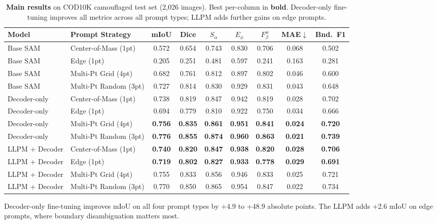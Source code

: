 \begin{table}[t]
\centering
\caption{\textbf{Main results} on COD10K camouflaged test set (2,026 images). Best per-column in \textbf{bold}. Decoder-only fine-tuning improves all metrics across all prompt types; LLPM adds further gains on edge prompts.}
\label{tab:main}
\small
\begin{tabular}{llccccccc}
\toprule
Model & Prompt Strategy & mIoU & Dice & $S_\alpha$ & $E_\phi$ & $F_\beta^w$ & MAE$\downarrow$ & Bnd.~F1 \\
\midrule
Base SAM & Center-of-Mass (1pt) & 0.572 & 0.654 & 0.743 & 0.830 & 0.706 & 0.068 & 0.502 \\
Base SAM & Edge (1pt) & 0.205 & 0.251 & 0.481 & 0.597 & 0.241 & 0.163 & 0.281 \\
Base SAM & Multi-Pt Grid (4pt) & 0.682 & 0.761 & 0.812 & 0.897 & 0.802 & 0.046 & 0.600 \\
Base SAM & Multi-Pt Random (3pt) & 0.727 & 0.814 & 0.830 & 0.929 & 0.831 & 0.043 & 0.648 \\
\midrule
Decoder-only & Center-of-Mass (1pt) & 0.738 & 0.819 & 0.847 & 0.942 & 0.819 & 0.028 & 0.702 \\
Decoder-only & Edge (1pt) & 0.694 & 0.779 & 0.810 & 0.922 & 0.750 & 0.034 & 0.666 \\
Decoder-only & Multi-Pt Grid (4pt) & \textbf{0.756} & \textbf{0.835} & \textbf{0.861} & \textbf{0.951} & \textbf{0.841} & \textbf{0.024} & \textbf{0.720} \\
Decoder-only & Multi-Pt Random (3pt) & \textbf{0.776} & \textbf{0.855} & \textbf{0.874} & \textbf{0.960} & \textbf{0.863} & \textbf{0.021} & \textbf{0.739} \\
\midrule
LLPM + Decoder & Center-of-Mass (1pt) & \textbf{0.740} & \textbf{0.820} & \textbf{0.847} & \textbf{0.938} & \textbf{0.820} & \textbf{0.028} & \textbf{0.706} \\
LLPM + Decoder & Edge (1pt) & \textbf{0.719} & \textbf{0.802} & \textbf{0.827} & \textbf{0.933} & \textbf{0.778} & \textbf{0.029} & \textbf{0.691} \\
LLPM + Decoder & Multi-Pt Grid (4pt) & 0.755 & 0.833 & 0.856 & 0.946 & 0.833 & 0.025 & 0.721 \\
LLPM + Decoder & Multi-Pt Random (3pt) & 0.770 & 0.850 & 0.865 & 0.954 & 0.847 & 0.022 & 0.734 \\
\bottomrule
\end{tabular}
\end{table}

Decoder-only fine-tuning improves mIoU on all four prompt types by +4.9 to +48.9 absolute points. The LLPM adds +2.6 mIoU on edge prompts, where boundary disambiguation matters most.

